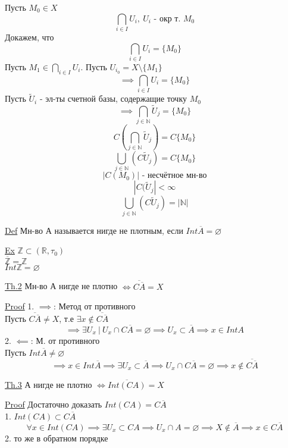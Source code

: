 \documentclass[a4paper]{article}
\begin{document}
Пусть $ M_0 \in X $ 
\[
    \bigcap_{i \in I} U_i, \ U_i \text{ - окр т. } M_0
\]
Докажем, что
\[
    \bigcap_{i \in I} U_i = \{ M_0 \}
\]
Пусть $ M_1 \in \bigcap_{i \in I}U_i $. Пусть $ U_{i_0} = X \setminus \{ M_1 \}  $  
\[
    \implies \bigcap_{i \in I} U_i = \{ M_0 \}
\]
Пусть $ \tilde{U}_i $ - эл-ты счетной базы, содержащие точку $ M_0 $ 
\[
    \implies \bigcap_{j \in \mathbb{N}} \tilde{U}_j = \{ M_0 \}
\]
\[
    C\left(\bigcap_{j \in \mathbb{N}} \tilde{U}_j\right) = C\{ M_0 \}
\]
\[
    \bigcup_{j \in \mathbb{N}}(C \tilde{U}_j) = C \{ M_0 \}
\]
\[
    | C(M_0) | \text{ - несчётное мн-во}
\]
\[
    |C(\tilde{U}_j| < \infty
\]
\[
    \bigcup_{j \in \mathbb{N}}(C \tilde{U}_j) = |\mathbb{N}|
\]

\begin{tcolorbox}
\underline{Def} Мн-во А называется нигде не плотным, если $ Int \overline{A} =
\varnothing$ 
\end{tcolorbox}

\underline{Ex} $ \mathbb{Z} \subset (\mathbb{R}, \tau_0) $ \\
$ \overline{\mathbb{Z}} = \mathbb{Z} $\\
$ Int \mathbb{Z} = \varnothing $ 

\begin{tcolorbox}
    \underline{Th.2} Мн-во А нигде не плотно $ \iff \overline{C \overline{A}} = X $ 

\underline{Proof} 1. $ \implies $: Метод от противного\\
Пусть $ \overline{C \overline{A}} \neq X $, т.е $ \exists x \notin \overline{C \overline{A}} $  
\[
    \implies \exists U_x \ | \ U_x \cap C \overline{A} = \varnothing \implies
    U_x \subset \overline{A} \implies x \in Int A
\]
2. $ \impliedby $: М. от противного\\
Пусть $ Int \overline{A} \neq \varnothing $ 
\[
    \implies x \in Int \overline{A} \implies \exists U_x \subset \overline{A}
    \implies U_x \cap C\overline{A} = \varnothing \implies x \notin \overline{
    C \overline{A}}
\]
\end{tcolorbox}

\begin{tcolorbox}
\underline{Th.3} А нигде не плотно $ \iff \overline{Int(CA)} = X $ 

\underline{Proof} Достаточно доказать $ Int(CA) = C \overline{A} $ \\
1. $ Int(CA) \subset C \overline{A} $ 
\[
    \forall x \in Int(CA) \implies \exists U_x \subset CA \implies U_x \cap A = 
    \varnothing \implies X \notin \overline{A} \implies x \in C \overline{A}
\]
2. то же в обратном порядке
\end{tcolorbox}
\end{document}
